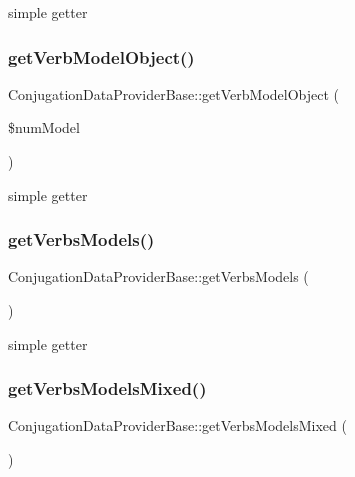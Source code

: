 simple getter \hypertarget{class_conjugation_data_provider_base_a4be78cfcdc11584d355bdfc8b988a3ca}{}\label{class_conjugation_data_provider_base_a4be78cfcdc11584d355bdfc8b988a3ca} 
\subsubsection{\texorpdfstring{get\+Verb\+Model\+Object()}{getVerbModelObject()}}
{\footnotesize\ttfamily Conjugation\+Data\+Provider\+Base\+::get\+Verb\+Model\+Object (\begin{DoxyParamCaption}\item[{}]{\$num\+Model }\end{DoxyParamCaption})\hspace{0.3cm}{\ttfamily [abstract]}}

simple getter \hypertarget{class_conjugation_data_provider_base_a12389ca76dbe2e31e08fee6b5333eed9}{}\label{class_conjugation_data_provider_base_a12389ca76dbe2e31e08fee6b5333eed9} 
\subsubsection{\texorpdfstring{get\+Verbs\+Models()}{getVerbsModels()}}
{\footnotesize\ttfamily Conjugation\+Data\+Provider\+Base\+::get\+Verbs\+Models (\begin{DoxyParamCaption}{ }\end{DoxyParamCaption})\hspace{0.3cm}{\ttfamily [abstract]}}

simple getter \hypertarget{class_conjugation_data_provider_base_a779d612fb1e1d20ea7fc31511768ad66}{}\label{class_conjugation_data_provider_base_a779d612fb1e1d20ea7fc31511768ad66} 
\subsubsection{\texorpdfstring{get\+Verbs\+Models\+Mixed()}{getVerbsModelsMixed()}}
{\footnotesize\ttfamily Conjugation\+Data\+Provider\+Base\+::get\+Verbs\+Models\+Mixed (\begin{DoxyParamCaption}{ }\end{DoxyParamCaption})\hspace{0.3cm}{\ttfamily [abstract]}}

